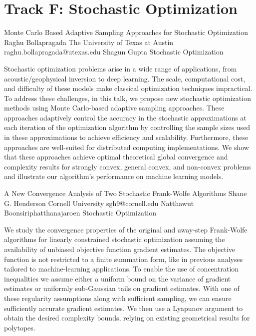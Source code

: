 \section{Track F: Stochastic Optimization}\newpage

\begin{talk}
  {Monte Carlo Based Adaptive Sampling Approaches for Stochastic Optimization}%
  {Raghu Bollapragada}%
  {The University of Texas at Austin}%
  {raghu.bollapragada@utexas.edu}%
  {Shagun Gupta}%
  {Stochastic Optimization}%
    
   
Stochastic optimization problems arise in a wide range of applications, from acoustic/geophysical inversion to deep learning. The scale, computational cost, and difficulty of these models make classical optimization techniques impractical. To address these challenges, in this talk, we propose new stochastic optimization methods using Monte Carlo-based adaptive sampling approaches. These approaches adaptively control the accuracy in the stochastic approximations at each iteration of the optimization algorithm by controlling the sample sizes used in these approximations to achieve efficiency and scalability. Furthermore, these approaches are well-suited for distributed computing implementations. We show that these approaches achieve optimal theoretical global convergence and complexity results for strongly convex, general convex, and non-convex problems and illustrate our algorithm's performance on machine learning models.

\medskip

\end{talk}

\begin{talk}
  {A New Convergence Analysis of Two Stochastic Frank-Wolfe Algorithms}%
  {Shane G. Henderson}%
  {Cornell University}%
  {sgh9@cornell.edu}%
  {Natthawut Boonsiriphatthanajaroen}%
  {Stochastic Optimization}%
    
   
We study the convergence properties of the original and away-step
Frank-Wolfe algorithms for linearly constrained stochastic
optimization assuming the availability of unbiased objective function
gradient estimates. The objective function is not restricted to a
finite summation form, like in previous analyses tailored to
machine-learning applications. To enable the use of concentration
inequalities we assume either a uniform bound on the variance of
gradient estimates or uniformly sub-Gaussian tails on gradient
estimates. With one of these regularity assumptions along with
sufficient sampling, we can ensure sufficiently accurate gradient
estimates. We then use a Lyapunov argument to obtain the desired
complexity bounds, relying on existing geometrical results for
polytopes. 
\end{talk}

